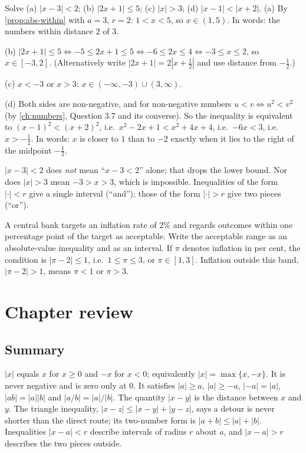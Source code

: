 \begin{example}
Solve (a) $|x-3|<2$; (b) $|2x+1|\le5$; (c) $|x|>3$; (d) $|x-1|<|x+2|$.
\solution
(a) By \cref{prop:abs-within} with $a=3$, $r=2$: $1<x<5$, so $x\in(1,5)$. In words: the numbers within distance
$2$ of $3$.

(b) $|2x+1|\le5\Leftrightarrow-5\le2x+1\le5\Leftrightarrow-6\le2x\le4\Leftrightarrow-3\le x\le2$, so $x\in[-3,2]$.
(Alternatively write $|2x+1|=2|x+\tfrac12|$ and use distance from $-\tfrac12$.)

(c) $x<-3$ or $x>3$: $x\in(-\infty,-3)\cup(3,\infty)$.

(d) Both sides are non-negative, and for non-negative numbers $u<v\Leftrightarrow u^2<v^2$ (by \cref{ch:numbers}, Question 3.7
and its converse). So the inequality is equivalent to $(x-1)^2<(x+2)^2$, i.e.\ $x^2-2x+1<x^2+4x+4$, i.e.\
$-6x<3$, i.e.\ $x>-\tfrac12$. In words: $x$ is closer to $1$ than to $-2$ exactly when it lies to the right of the
midpoint $-\tfrac12$.
\end{example}

\begin{warning}
$|x-3|<2$ does \emph{not} mean ``$x-3<2$'' alone; that drops the lower bound. Nor does $|x|>3$ mean $-3>x>3$, which
is impossible. Inequalities of the form $|\cdot|<r$ give a single interval (``and''); those of the form $|\cdot|>r$
give two pieces (``or'').
\end{warning}

\begin{example}
A central bank targets an inflation rate of $2\%$ and regards outcomes within one percentage point of the target as
acceptable. Write the acceptable range as an absolute-value inequality and as an interval.
\solution
If $\pi$ denotes inflation in per cent, the condition is $|\pi-2|\le1$, i.e.\ $1\le\pi\le3$, or $\pi\in[1,3]$.
Inflation outside this band, $|\pi-2|>1$, means $\pi<1$ or $\pi>3$.
\end{example}

\section{Chapter review}
\subsection*{Summary}
$|x|$ equals $x$ for $x\ge0$ and $-x$ for $x<0$; equivalently $|x|=\max\{x,-x\}$. It is never negative and is zero
only at $0$. It satisfies $|a|\ge a$, $|a|\ge-a$, $|{-a}|=|a|$, $|ab|=|a||b|$ and $|a/b|=|a|/|b|$. The quantity
$|x-y|$ is the distance between $x$ and $y$. The triangle inequality, $|x-z|\le|x-y|+|y-z|$, says a detour is never
shorter than the direct route; its two-number form is $|a+b|\le|a|+|b|$. Inequalities $|x-a|<r$ describe intervals of
radius $r$ about $a$, and $|x-a|>r$ describes the two pieces outside.

